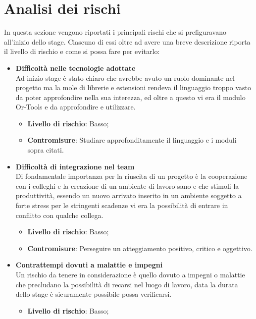 \section{Analisi dei rischi}
In questa sezione vengono riportati i principali rischi che si prefiguravano all'inizio dello stage. Ciascuno di essi oltre ad avere una breve descrizione riporta il livello di rischio e come si possa fare per evitarlo:
\begin{itemize}
	\item \textbf{Difficoltà nelle tecnologie adottate}\\
	      Ad inizio stage è stato chiaro che  avrebbe avuto un ruolo dominante nel progetto ma la mole di librerie e estensioni rendeva il linguaggio troppo vasto da poter approfondire nella sua interezza, ed oltre a questo vi era il modulo Or-Tools e  da approfondire e utilizzare.
	      \begin{itemize}
	      	\item \textbf{Livello di rischio}: Basso;
	      	\item \textbf{Contromisure}: Studiare approfonditamente il linguaggio  e i moduli sopra citati.
	      \end{itemize}
	\item \textbf{Difficoltà di integrazione nel team}\\
	      Di fondamentale importanza per la riuscita di un progetto è la cooperazione con i colleghi e la creazione di un ambiente di lavoro sano e che stimoli la produttività, essendo un nuovo arrivato inserito in un ambiente soggetto a forte stress per le stringenti scadenze vi era la possibilità di entrare in conflitto con qualche collega.
	      \begin{itemize}
	      	\item \textbf{Livello di rischio}: Basso;
	      	\item \textbf{Contromisure}: Perseguire un atteggiamento positivo, critico e oggettivo.
	      \end{itemize}
	\item \textbf{Contrattempi dovuti a malattie e impegni}\\
	      Un rischio da tenere in considerazione è quello dovuto a impegni o malattie che precludano la possibilità di recarsi nel luogo di lavoro, data la durata dello stage è sicuramente possibile possa verificarsi.
	      \begin{itemize}
	      	\item \textbf{Livello di rischio}: Basso;

\end{itemize}
\end{itemize}
